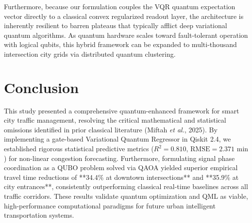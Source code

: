 \documentclass[journal,twoside]{IEEEtran}
\begin{document}
Furthermore, because our formulation couples the VQR quantum expectation vector directly to a classical convex regularized readout layer, the architecture is inherently resilient to barren plateaus that typically afflict deep variational quantum algorithms. As quantum hardware scales toward fault-tolerant operation with logical qubits, this hybrid framework can be expanded to multi-thousand intersection city grids via distributed quantum clustering.

\section{Conclusion}
This study presented a comprehensive quantum-enhanced framework for smart city traffic management, resolving the critical mathematical and statistical omissions identified in prior classical literature (Miftah \textit{et al.}, 2025). By implementing a gate-based Variational Quantum Regressor in Qiskit 2.4, we established rigorous statistical predictive metrics ($R^2 = 0.810$, $\text{RMSE} = 2.371\text{ min}$) for non-linear congestion forecasting. Furthermore, formulating signal phase coordination as a QUBO problem solved via QAOA yielded superior empirical travel time reductions of **34.4\% at downtown intersections** and **35.9\% at city entrances**, consistently outperforming classical real-time baselines across all traffic corridors. These results validate quantum optimization and QML as viable, high-performance computational paradigms for future urban intelligent transportation systems.



\end{document}
